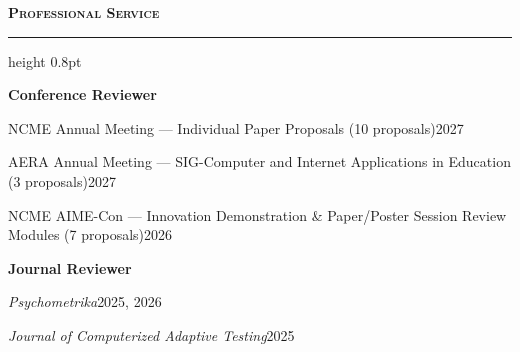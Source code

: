 \documentclass[10.5pt,letterpaper]{article}
\renewcommand{\section}[1]{%
  \needspace{3\baselineskip}\vspace{12pt}\par
  {\fontsize{13.5}{16}\selectfont\bfseries\scshape\color{accent}#1}\hspace{6pt}%
  {\color{accent}\leaders\hrule height 0.8pt\hfill\kern0pt}\par\vspace{6pt}}
\newcommand{\row}[2]{\needspace{1\baselineskip}#1\hfill#2\par\vspace{2pt}}
\begin{document}
\section{Professional Service}
{\color{textdark}\textbf{Conference Reviewer}}\par\vspace{2pt}
\row{NCME Annual Meeting --- Individual Paper Proposals (10 proposals)}{2027}
\row{AERA Annual Meeting --- SIG-Computer and Internet Applications in Education (3 proposals)}{2027}
\row{NCME AIME-Con --- Innovation Demonstration \& Paper/Poster Session Review Modules (7 proposals)}{2026}
\vspace{4pt}
{\color{textdark}\textbf{Journal Reviewer}}\par\vspace{2pt}
\row{\textit{Psychometrika}}{2025, 2026}
\row{\textit{Journal of Computerized Adaptive Testing}}{2025}
\end{document}
